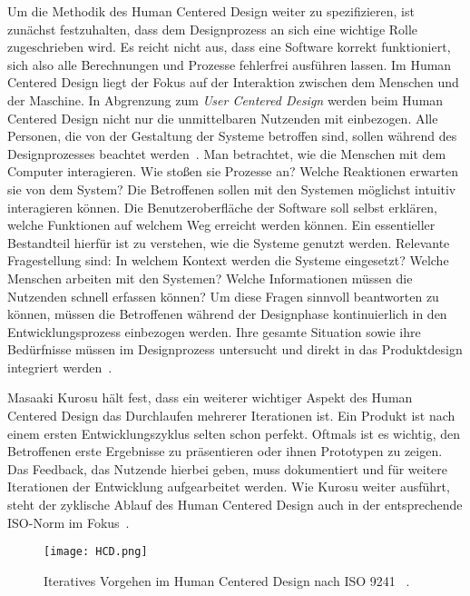 Um die Methodik des Human Centered Design weiter zu spezifizieren, ist zunächst
festzuhalten, dass dem Designprozess an sich eine wichtige Rolle zugeschrieben
wird. Es reicht nicht aus, dass eine Software korrekt funktioniert, sich also
alle Berechnungen und Prozesse fehlerfrei ausführen lassen. Im Human Centered
Design liegt der Fokus auf der Interaktion zwischen dem Menschen und der
Maschine. In Abgrenzung zum \textit{User Centered Design} werden beim Human
Centered Design nicht nur die unmittelbaren Nutzenden mit einbezogen. Alle
Personen, die von der Gestaltung der Systeme betroffen sind, sollen während des
Designprozesses beachtet werden~\cite{sequenceDiagrams}. Man betrachtet, wie die
Menschen mit dem Computer interagieren. Wie stoßen sie Prozesse an? Welche
Reaktionen erwarten sie von dem System? Die Betroffenen sollen mit den Systemen
möglichst intuitiv interagieren können. Die Benutzeroberfläche der Software
soll selbst erklären, welche Funktionen auf welchem Weg erreicht werden können.
Ein essentieller Bestandteil hierfür ist zu verstehen, wie die Systeme genutzt
werden. Relevante Fragestellung sind: In welchem Kontext werden die
Systeme eingesetzt? Welche Menschen arbeiten mit den Systemen? Welche
Informationen müssen die Nutzenden schnell erfassen können? Um diese Fragen
sinnvoll beantworten zu können, müssen die Betroffenen während der Designphase
kontinuierlich in den Entwicklungsprozess einbezogen werden. Ihre gesamte
Situation sowie ihre Bedürfnisse müssen im Designprozess untersucht und direkt
in das Produktdesign integriert werden~\cite{hci}.

Masaaki Kurosu hält fest, dass ein weiterer wichtiger Aspekt des Human Centered
Design das Durchlaufen mehrerer Iterationen ist. Ein Produkt ist nach einem ersten
Entwicklungszyklus selten schon perfekt. Oftmals ist es wichtig, den Betroffenen
erste Ergebnisse zu präsentieren oder ihnen Prototypen zu zeigen. Das Feedback,
das Nutzende hierbei geben, muss dokumentiert und für weitere Iterationen der
Entwicklung aufgearbeitet werden. Wie Kurosu weiter ausführt, steht der
zyklische Ablauf des Human Centered Design auch in der entsprechende ISO-Norm
im Fokus~\cite{kurosuHCI}.

\begin{figure}[H]
    \caption{Iteratives Vorgehen im Human Centered Design nach ISO 9241 ~\cite{ISO9241Graphic}.}
    \label{fig:iso-diagram}
    \centering
    \texttt{[image: HCD.png]}
\end{figure}

